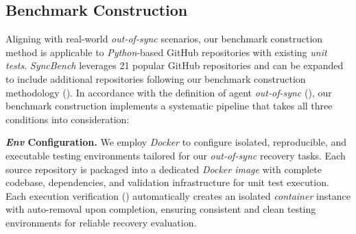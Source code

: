 \subsection{Benchmark Construction}
\label{Section: Benchmark Construction}
Aligning with real-world \textit{out-of-sync} scenarios, our benchmark construction method is applicable to \textit{Python}-based GitHub repositories with existing \textit{unit tests}.
\textit{SyncBench} leverages 21 popular GitHub repositories and can be expanded to include additional repositories following our benchmark construction methodology ().
In accordance with the definition of agent \textit{out-of-sync} (), our benchmark construction implements a systematic pipeline that takes all three conditions into consideration:





\textbf{\textit{Env} Configuration.}
We employ \textit{Docker} \cite{docker_for_env_config} to configure isolated, reproducible, and executable testing environments tailored for our \textit{out-of-sync} recovery tasks.
% 
Each source repository is packaged into a dedicated \textit{Docker image} with complete codebase, dependencies, and validation infrastructure for unit test execution.
% 
Each execution verification () automatically creates an isolated \textit{container} instance with auto-removal upon completion, ensuring consistent and clean testing environments for reliable recovery evaluation.


